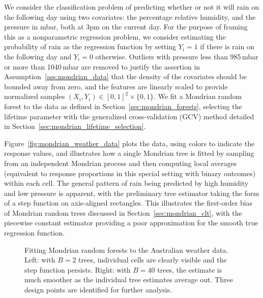 \documentclass[11pt,lof]{puthesis}
\theoremstyle{break}
\theoremstyle{proof}
\begin{document}
We consider the classification problem of predicting whether or not it will
rain on the following day using two covariates: the percentage relative
humidity, and the pressure in mbar, both at 3pm on the current day. For the
purpose of framing this as a nonparametric regression problem, we consider
estimating the probability of rain as the regression function by setting
$Y_i = 1$ if there is rain on the following day and $Y_i = 0$ otherwise.
Outliers with pressure less than 985\,mbar or more than 1040\,mbar are removed
to justify the assertion in Assumption~\ref{ass:mondrian_data} that the density
of the covariates should be bounded away from zero, and the features are
linearly scaled to provide normalized samples
$(X_i, Y_i) \in [0, 1]^2 \times \{0, 1\}$.
We fit a Mondrian random forest to the data as defined in
Section~\ref{sec:mondrian_forests}, selecting the lifetime parameter with the
generalized cross-validation (GCV) method detailed in
Section~\ref{sec:mondrian_lifetime_selection}.

Figure~\ref{fig:mondrian_weather_data} plots the
data, using colors to indicate the response values, and illustrates how a
single Mondrian tree is fitted by sampling from an independent Mondrian process
and then computing local averages (equivalent to response proportions in this
special setting with binary outcomes) within each cell. The general pattern of
rain being predicted by high humidity and low pressure is apparent, with the
preliminary tree estimator taking the form of a step function on axis-aligned
rectangles. This illustrates the first-order bias of Mondrian random trees
discussed in Section~\ref{sec:mondrian_clt}, with the piecewise constant
estimator providing a poor approximation for the smooth true regression
function.

\begin{figure}[b!]
\centering
\begin{subfigure}{0.49\textwidth}
\centering
\end{subfigure}
\begin{subfigure}{0.49\textwidth}
\centering
\end{subfigure}
\caption[Fitting Mondrian random forests to the Australian weather data]{
Fitting Mondrian random forests to the Australian weather data.
Left: with $B=2$ trees, individual cells are clearly visible and the step
function persists. Right: with $B=40$ trees, the estimate is much smoother
as the individual tree estimates average out.
Three design points are identified for further analysis.}
\label{fig:mondrian_weather_forest}
\end{figure}
\end{document}
